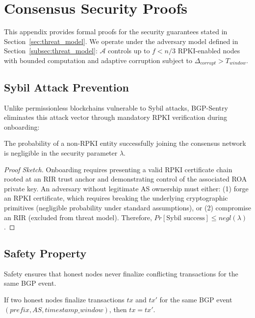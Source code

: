 \section{Consensus Security Proofs}
\label{app:security_proofs}

This appendix provides formal proofs for the security guarantees stated in Section~\ref{sec:threat_model}. We operate under the adversary model defined in Section~\ref{subsec:threat_model}: $\mathcal{A}$ controls up to $f < n/3$ RPKI-enabled nodes with bounded computation and adaptive corruption subject to $\Delta_{corrupt} > T_{window}$.

\subsection{Sybil Attack Prevention}

Unlike permissionless blockchains vulnerable to Sybil attacks, BGP-Sentry eliminates this attack vector through mandatory RPKI verification during onboarding:

\begin{theorem}
The probability of a non-RPKI entity successfully joining the consensus network is negligible in the security parameter $\lambda$.
\end{theorem}

\begin{proof}[Proof Sketch]
Onboarding requires presenting a valid RPKI certificate chain rooted at an RIR trust anchor and demonstrating control of the associated ROA private key. An adversary without legitimate AS ownership must either: (1) forge an RPKI certificate, which requires breaking the underlying cryptographic primitives (negligible probability under standard assumptions), or (2) compromise an RIR (excluded from threat model). Therefore, $Pr[\text{Sybil success}] \leq negl(\lambda)$.
\end{proof}

\subsection{Safety Property}

Safety ensures that honest nodes never finalize conflicting transactions for the same BGP event.

\begin{theorem}
If two honest nodes finalize transactions $tx$ and $tx'$ for the same BGP event $(prefix, AS, timestamp\_window)$, then $tx = tx'$.
\end{theorem}


